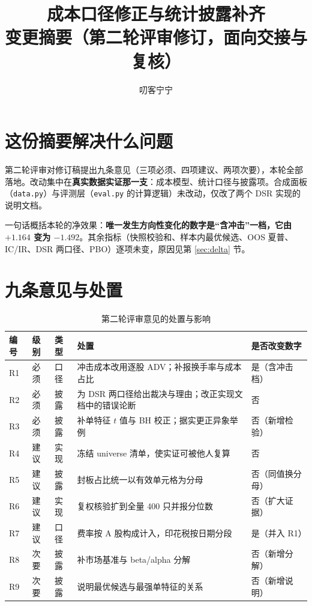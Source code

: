 \documentclass[11pt,a4paper]{ctexart}
\title{\bfseries 成本口径修正与统计披露补齐\\\large 变更摘要（第二轮评审修订，面向交接与复核）}
\author{\large 叨客宁宁}
\date{}
\begin{document}
\maketitle

\section{这份摘要解决什么问题}

第二轮评审对修订稿提出九条意见（三项必须、四项建议、两项次要），本轮全部落地。改动集中在\textbf{真实数据实证那一支}：成本模型、统计口径与披露项。合成面板（\texttt{data.py}）与评测层（\texttt{eval.py} 的计算逻辑）未改动，仅改了两个 DSR 实现的说明文档。

一句话概括本轮的净效果：\textbf{唯一发生方向性变化的数字是“含冲击”一档，它由 $+1.164$ 变为 $-1.492$}。其余指标（快照校验和、样本内最优候选、OOS 夏普、IC/IR、DSR 两口径、PBO）逐项未变，原因见第 \ref{sec:delta} 节。

\section{九条意见与处置}

\begin{table}[htbp]
\centering
\caption{第二轮评审意见的处置与影响}
\label{tab:items}
\begin{tabular}{@{}>{\raggedright\arraybackslash}p{0.8cm}>{\raggedright\arraybackslash}p{1.2cm}>{\raggedright\arraybackslash}p{1.5cm}>{\raggedright\arraybackslash}p{7.4cm}>{\raggedright\arraybackslash}p{2.4cm}@{}}
\toprule
编号 & 级别 & 类型 & 处置 & 是否改变数字 \\
\midrule
R1 & 必须 & 口径 & 冲击成本改用逐股 ADV；补报换手率与成本占比 & 是（含冲击档） \\
R2 & 必须 & 披露 & 为 DSR 两口径给出裁决与理由；改正实现文档中的错误论断 & 否 \\
R3 & 必须 & 披露 & 补单特征 $t$ 值与 BH 校正；据实更正异象举例 & 否（新增检验） \\
R4 & 建议 & 实现 & 冻结 universe 清单，使实证可被他人复算 & 否 \\
R5 & 建议 & 披露 & 封板占比统一以有效单元格为分母 & 否（同值换分母） \\
R6 & 建议 & 实现 & 复权核验扩到全量 400 只并报分位数 & 否（扩大证据） \\
R7 & 建议 & 口径 & 费率按 A 股构成计入，印花税按日期分段 & 是（并入 R1） \\
R8 & 次要 & 披露 & 补市场基准与 beta/alpha 分解 & 否（新增分解） \\
R9 & 次要 & 披露 & 说明最优候选与最强单特征的关系 & 否（新增说明） \\
\bottomrule
\end{tabular}
\end{table}
\end{document}

